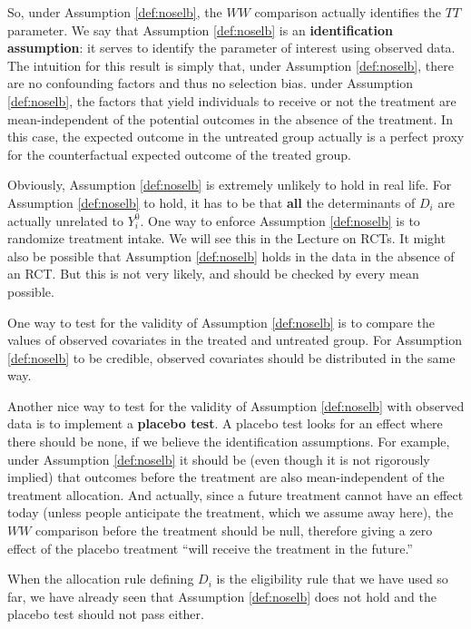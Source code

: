 \documentclass[]{book}
\theoremstyle{definition}
\theoremstyle{definition}
\theoremstyle{definition}
\theoremstyle{remark}
\let\BeginKnitrBlock\begin \let\EndKnitrBlock\end
\begin{document}
So, under Assumption \ref{def:noselb}, the \(WW\) comparison actually identifies the \(TT\) parameter.
We say that Assumption \ref{def:noselb} is an \textbf{identification assumption}: it serves to identify the parameter of interest using observed data.
The intuition for this result is simply that, under Assumption \ref{def:noselb}, there are no confounding factors and thus no selection bias.
under Assumption \ref{def:noselb}, the factors that yield individuals to receive or not the treatment are mean-independent of the potential outcomes in the absence of the treatment.
In this case, the expected outcome in the untreated group actually is a perfect proxy for the counterfactual expected outcome of the treated group.

Obviously, Assumption \ref{def:noselb} is extremely unlikely to hold in real life.
For Assumption \ref{def:noselb} to hold, it has to be that \textbf{all} the determinants of \(D_i\) are actually unrelated to \(Y_i^0\).
One way to enforce Assumption \ref{def:noselb} is to randomize treatment intake.
We will see this in the Lecture on RCTs.
It might also be possible that Assumption \ref{def:noselb} holds in the data in the absence of an RCT.
But this is not very likely, and should be checked by every mean possible.

One way to test for the validity of Assumption \ref{def:noselb} is to compare the values of observed covariates in the treated and untreated group.
For Assumption \ref{def:noselb} to be credible, observed covariates should be distributed in the same way.

Another nice way to test for the validity of Assumption \ref{def:noselb} with observed data is to implement a \textbf{placebo test}.
A placebo test looks for an effect where there should be none, if we believe the identification assumptions.
For example, under Assumption \ref{def:noselb} it should be (even though it is not rigorously implied) that outcomes before the treatment are also mean-independent of the treatment allocation.
And actually, since a future treatment cannot have an effect today (unless people anticipate the treatment, which we assume away here), the \(WW\) comparison before the treatment should be null, therefore giving a zero effect of the placebo treatment ``will receive the treatment in the future.''

\BeginKnitrBlock{example}
\protect\hypertarget{exm:unnamed-chunk-21}{}{\label{exm:unnamed-chunk-21} }When the allocation rule defining \(D_i\) is the eligibility rule that we have used so far, we have already seen that Assumption \ref{def:noselb} does not hold and the placebo test should not pass either.
\EndKnitrBlock{example}
\end{document}
